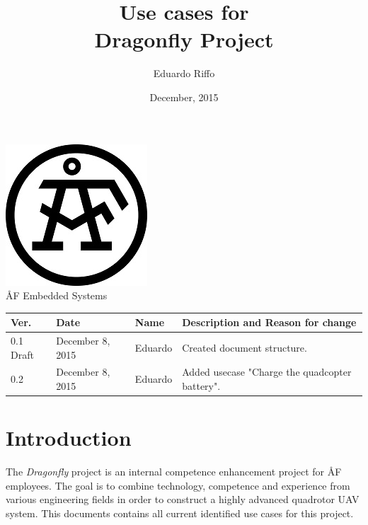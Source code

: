 \documentclass[a4paper]{article}
\title{ Use cases for\\ Dragonfly Project}
\author{Eduardo Riffo}
\date{December, 2015}         		%
\begin{document}

\maketitle                      	%

\begin{center}
\vspace{64pt}
\includegraphics[scale=1.6]{images/AF_Logotype20141_Black.png}
\vspace{16pt}
\\ \large ÅF Embedded Systems
\end{center}

\vspace{16pt}
\begin{tabular}{ l l l p{8.5cm} }
	Ver. & Date & Name & Description and Reason for change \\\hline
	0.1 Draft & December 8, 2015 & Eduardo & Created document structure.\\
	0.2  & December 8, 2015 & Eduardo & Added usecase "Charge the quadcopter battery".\\
\end{tabular}

\newpage

\tableofcontents					%

\newpage

\section{Introduction}

The \emph{Dragonfly} project is an internal competence enhancement project for ÅF employees. The goal is to combine technology, competence and experience from various engineering fields in order to construct a highly advanced quadrotor UAV system. This documents contains all current identified use cases for this project.
\end{document}
